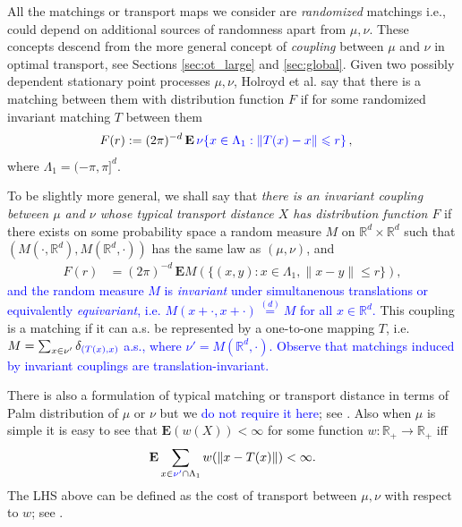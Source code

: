 \documentclass[12pt]{article}
\newcommand{\R}{\mathbb{R}}
\newcommand{\equlaw}{\stackrel{(d)}{=}}
\newcommand{\1}{\mathbf{1}}
\newcommand{\RL}[1]{\textcolor{blue}{#1}}
\newcommand{\dy}[1]{\textcolor{blue}{#1}}
\newcommand{\RL}[1]{#1}%
\newcommand{\dy}[1]{#1}%
\begin{document}
All the matchings or transport maps we consider are {\it randomized} matchings i.e., could depend on additional sources of  randomness apart from $\mu,\nu$. These concepts descend from the more general concept of  {\it coupling} between $ \mu $ and $ \nu $ in optimal transport, see Sections \ref{sec:ot_large} and \ref{sec:global}.
Given  two possibly dependent stationary point processes $ \mu ,\nu $,  Holroyd et al. \cite{holroyd2009poisson}  say that there is a matching between them with distribution function $ F$ if for some randomized invariant matching $ T$ between them
\begin{align}
\label{def:typical_matching_dist}
F(r) &:= (2\pi)^{-d} \, \mathbf{E} \, \dy{\nu\{x \in \Lambda_1 :  \|T(x)-x\|  \leqslant r \}}\,  , %
\end{align}where $\Lambda_1 = (-\pi,\pi]^d$.
 {  {To be slightly more general, we shall say that  {\it  there is an invariant coupling between $ \mu $ and $ \nu $ whose typical transport distance $ X$ has distribution function $ F$}
if there exists on some probability space a  random  measure $ M$   on $ \mathbb{R}^{d}\times \mathbb{R}^{d}$ such that $ (M(\cdot ,\mathbb{R}^{d}),M(\mathbb{R}^{d},\cdot ))$ has the same law as $ (\mu ,\nu )$, and}
%
\begin{align}
\label{def:typical-dist}F(r) %
& = (2\pi)^{-d} \, \mathbf{E} M(\{(x,y):x\in \Lambda _{1},\|x-y\|\leqslant r\})%
,
\end{align}
%
\RL{and}
\dy{the random measure $M$ is {\em invariant} under simultanenous translations or equivalently {\em equivariant},  \RL{i.e.} $M(x + \cdot ,x + \cdot ) \equlaw M$   for all $x \in \R^d$.} This coupling is a matching if it can a.s. be represented by a one-to-one mapping $ T$, i.e. \RL{$ M = \sum_{x\in \nu'}  \delta _{\dy{(T(x),x)}}$ a.s., where $\nu'  = M(\mathbb{R}^{ d},\cdot ).$ Observe that matchings induced by invariant couplings are translation-invariant.}

There is also a formulation of typical matching or transport distance in terms of Palm distribution of $\mu$ or $\nu$ but we  \RL{do not require it here}; see \cite[Section 2]{holroyd2009poisson}. Also {when $\mu $ is simple} it is easy to see that $\mathbf{E}(w(X)) < \infty$ for some  function $ w:\mathbb{R}_{ + }\to \mathbb{R}_{ + }$ iff  
%
\begin{align}
\label{e:typical_cost_w}
\mathbf{E}\sum_{x\in \RL{ \nu' } \cap \Lambda _{1} }w(\|x-T(x)\|)<\infty .
\end{align}
%
The LHS above can be defined as the cost of transport between $\mu,\nu$ with respect to $w$; see \cite[(2.4)]{erbar2023optimal}. 


}
\end{document}

